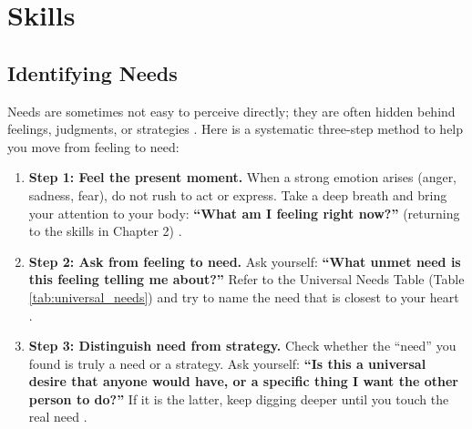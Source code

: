 \section{Skills}

\subsection{Identifying Needs}

Needs are sometimes not easy to perceive directly; they are often hidden
behind feelings, judgments, or strategies \citep{rizzolatti2004}.
Here is a systematic three-step method to help you move from feeling to
need:

\begin{enumerate}
    \item \textbf{Step 1: Feel the present moment.}
    When a strong emotion arises (anger, sadness, fear), do not rush to
    act or express.
    Take a deep breath and bring your attention to your body:
    \textbf{``What am I feeling right now?''} (returning to the skills in
    Chapter 2) \citep{decety2021}.

    \item \textbf{Step 2: Ask from feeling to need.}
    Ask yourself: \textbf{``What unmet need is this feeling telling me
    about?''}
    Refer to the Universal Needs Table (Table \ref{tab:universal_needs})
    and try to name the need that is closest to your heart \citep{warneken2018}.

    \item \textbf{Step 3: Distinguish need from strategy.}
    Check whether the ``need'' you found is truly a need or a strategy.
    Ask yourself: \textbf{``Is this a universal desire that anyone would
    have, or a specific thing I want the other person to do?''}
    If it is the latter, keep digging deeper until you touch the real
    need \citep{streubel2021}.
\end{enumerate}

